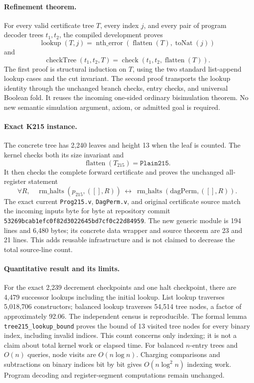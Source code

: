 \paragraph{Refinement theorem.}
For every valid certificate tree \(T\), every index \(j\), and every pair of
program decoder trees \(t_1,t_2\), the compiled development proves
\[
 \operatorname{lookup}(T,j)=
 \operatorname{nth\_error}(\operatorname{flatten}(T),\operatorname{toNat}(j))
\]
and
\[
 \operatorname{checkTree}(t_1,t_2,T)=
 \operatorname{check}(t_1,t_2,\operatorname{flatten}(T)).
\]
The first proof is structural induction on \(T\), using the two standard
list-append lookup cases and the cut invariant. The second proof transports
the lookup identity through the unchanged branch checks, entry checks, and
universal Boolean fold. It reuses the incoming one-sided ordinary
bisimulation theorem. No new semantic simulation argument, axiom, or admitted
goal is required.

\paragraph{Exact K215 instance.}
The concrete tree has 2,240 leaves and height 13 when the leaf is counted.
The kernel checks both its size invariant and
\[
 \operatorname{flatten}(T_{215})=\texttt{Plain215}.
\]
It then checks the complete forward certificate and proves the unchanged
all-register statement
\[
 \forall R,\quad
 \operatorname{rm\_halts}(p_{215},([],R))
 \ \longleftrightarrow\
 \operatorname{rm\_halts}(\mathrm{dagPerm},([],R)).
\]
The exact current \texttt{Prog215.v}, \texttt{DagPerm.v}, and original
certificate source match the incoming inputs byte for byte at repository
commit \texttt{53269bcab1efc0f82d3022645bd7cf0c22d84959}.
The new generic module is 194 lines and 6,480 bytes; its concrete data wrapper
and source theorem are 23 and 21 lines. This adds reusable infrastructure
and is not claimed to decrease the total source-line count.

\paragraph{Quantitative result and its limits.}
For the exact 2,239 decrement checkpoints and one halt checkpoint, there are
4,479 successor lookups including the initial lookup. List lookup traverses
5,018,706 constructors; balanced lookup traverses 54,514 tree nodes, a factor
of approximately 92.06. The independent census is reproducible. The formal
lemma \texttt{tree215\_lookup\_bound} proves the bound of 13 visited tree
nodes for every binary index, including invalid indices. This count concerns
only indexing; it is not a claim about total kernel work or elapsed time.
For balanced \(n\)-entry trees and \(O(n)\) queries, node visits are
\(O(n\log n)\). Charging comparisons and subtractions on binary indices
bit by bit gives \(O(n\log^2 n)\) indexing work. Program decoding and
register-segment computations remain unchanged.

